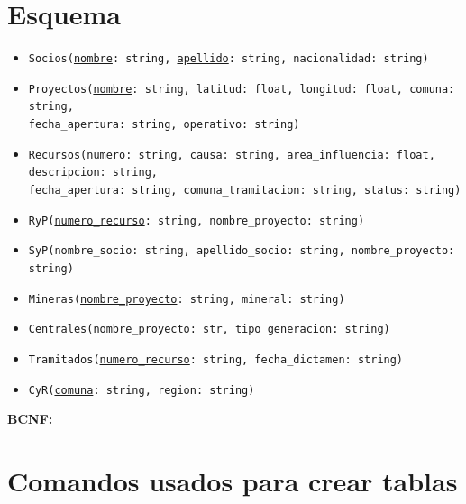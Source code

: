 \documentclass{article}
\begin{document}
\section{Esquema}

	\begin{itemize}
		\item \texttt{Socios(\underline{nombre}: string, \underline{apellido}: string, nacionalidad: string)} 
		\item \texttt{Proyectos(\underline{nombre}: string, latitud: float, longitud: float, comuna: string,\\ fecha\_apertura: string, operativo: string)} 
		\item \texttt{Recursos(\underline{numero}: string, causa: string, area\_influencia: float, descripcion: string,\\ fecha\_apertura: string, comuna\_tramitacion: string, status: string)}
		\item \texttt{RyP(\underline{numero\_recurso}: string, nombre\_proyecto: string)} 
		
		\item \texttt{SyP(nombre\_socio: string, apellido\_socio: string, nombre\_proyecto: string)} 
		 
		\item \texttt{Mineras(\underline{nombre\_proyecto}: string, mineral: string)} 
		\item \texttt{Centrales(\underline{nombre\_proyecto}: str, tipo generacion: string)} 
		\item \texttt{Tramitados(\underline{numero\_recurso}: string, fecha\_dictamen: string)} 
		
		\item \texttt{CyR(\underline{comuna}: string, region: string)} 
	\end{itemize}

\textbf{BCNF:} %

\section{Comandos usados para crear tablas}
\end{document}
